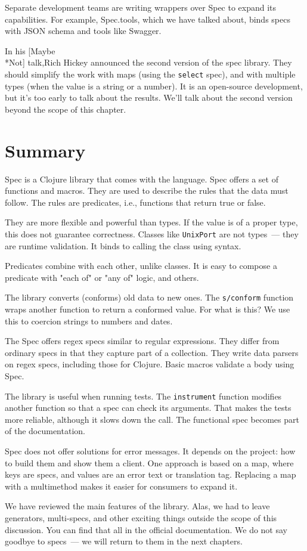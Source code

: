Separate development teams are writing wrappers over Spec to expand its capabilities. For example, Spec.tools, which we have talked about, binds specs with JSON schema and tools like Swagger.


In his [Maybe\\*Not] talk,Rich Hickey announced the second version of the spec library. They should simplify the work with maps (using the \verb|select| spec), and with multiple types (when the value is a string or a number). It is an open-source development, but it's too early to talk about the results. We'll talk about the second version beyond the scope of this chapter.

\section{Summary}

Spec is a Clojure library that comes with the language. Spec offers a set of functions and macros. They are used to describe the rules that the data must follow. The rules are predicates, i.e., functions that return true or false.

They are more flexible and powerful than types. If the value is of a proper type, this does not guarantee correctness. Classes like \verb|UnixPort| are not types~--- they are runtime validation. It binds to calling the class using syntax.

Predicates combine with each other, unlike classes. It is easy to compose a predicate with "each of" or "any of" logic, and others.

The library converts (conforms) old data to new ones. The \verb|s/conform| function wraps another function to return a conformed value. For what is this? We use this to coercion strings to numbers and dates.

The Spec offers regex specs similar to regular expressions. They differ from ordinary specs in that they capture part of a collection. They write data parsers on regex specs, including those for Clojure. Basic macros validate a body using Spec.

The library is useful when running tests. The \verb|instrument| function modifies another function so that a spec can check its arguments. That makes the tests more reliable, although it slows down the call. The functional spec becomes part of the documentation.

Spec does not offer solutions for error messages. It depends on the project: how to build them and show them a client. One approach is based on a map, where keys are specs, and values are an error text or translation tag. Replacing a map with a multimethod makes it easier for consumers to expand it.

We have reviewed the main features of the library. Alas, we had to leave generators, multi-specs, and other exciting things outside the scope of this discussion. You can find that all in the official documentation. We do not say goodbye to specs~--- we will return to them in the next chapters.
